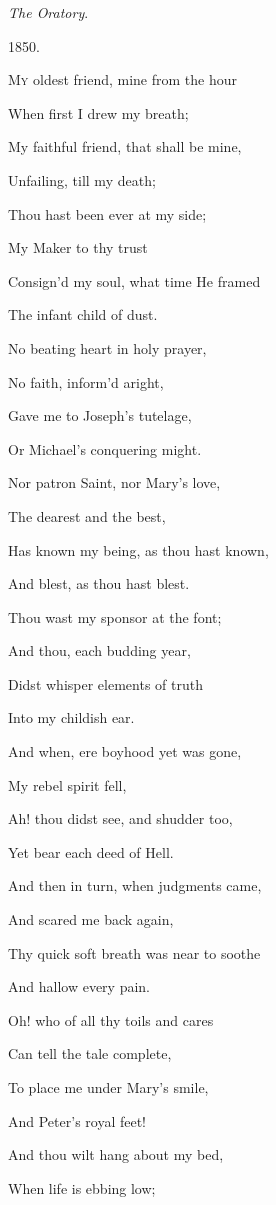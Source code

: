 \emph{The Oratory}.

1850.


M\textsc{y} oldest friend, mine from the hour

When first I drew my breath;

My faithful friend, that shall be mine,

Unfailing, till my death;

Thou hast been ever at my side;

My Maker to thy trust

Consign'd my soul, what time He framed

The infant child of dust.

No beating heart in holy prayer,

No faith, inform'd aright,

Gave me to Joseph's tutelage,

Or Michael's conquering might.

Nor patron Saint, nor Mary's love,

The dearest and the best,

Has known my being, as thou hast known,

And blest, as thou hast blest. 

Thou wast my sponsor at the font;

And thou, each budding year,

Didst whisper elements of truth

Into my childish ear.

And when, ere boyhood yet was gone,

My rebel spirit fell,

Ah! thou didst see, and shudder too,

Yet bear each deed of Hell.

And then in turn, when judgments came,

And scared me back again,

Thy quick soft breath was near to soothe

And hallow every pain.

Oh! who of all thy toils and cares

Can tell the tale complete,

To place me under Mary's smile,

And Peter's royal feet!

And thou wilt hang about my bed,

When life is ebbing low;

